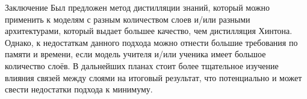 \documentclass{beamer}
\begin{document}
\begin{frame}{Заключение}
    Был предложен метод дистилляции знаний, который можно применить к моделям с разным количеством слоев и/или разными архитектурами,
    который выдает большее качество, чем дистилляция Хинтона. Однако, к недостаткам данного подхода можно отнести большие требования по памяти и времени,
    если модель учителя и/или ученика имеет большое количество слоёв. В дальнейших планах стоит более тщательное изучение влияния связей между слоями на итоговый результат,
    что потенциально и может свести недостатки подхода к минимуму.
\end{frame}

\end{document}
